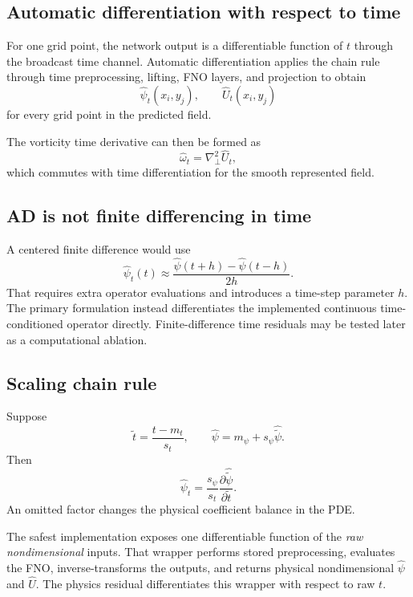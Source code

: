 \documentclass[11pt]{article}
\newcommand{\pd}{\partial}
\newcommand{\Lap}{\nabla_\perp^2}
\begin{document}
\subsection{Automatic differentiation with respect to time}
For one grid point, the network output is a differentiable function of $t$ through the broadcast time channel. Automatic differentiation applies the chain rule through time preprocessing, lifting, FNO layers, and projection to obtain
\begin{equation}
\widehat\psi_t(x_i,y_j),\qquad \widehat U_t(x_i,y_j)
\end{equation}
for every grid point in the predicted field.

The vorticity time derivative can then be formed as
\begin{equation}
\widehat\omega_t=\Lap\widehat U_t,
\end{equation}
which commutes with time differentiation for the smooth represented field.

\subsection{AD is not finite differencing in time}
A centered finite difference would use
\begin{equation}
\widehat\psi_t(t)\approx
\frac{\widehat\psi(t+h)-\widehat\psi(t-h)}{2h}.
\end{equation}
That requires extra operator evaluations and introduces a time-step parameter $h$. The primary formulation instead differentiates the implemented continuous time-conditioned operator directly. Finite-difference time residuals may be tested later as a computational ablation.

\subsection{Scaling chain rule}
Suppose
\begin{equation}
\widetilde t=\frac{t-m_t}{s_t},
\qquad
\widehat\psi=m_\psi+s_\psi\widehat{\widetilde\psi}.
\end{equation}
Then
\begin{equation}
\widehat\psi_t
=\frac{s_\psi}{s_t}
\frac{\pd\widehat{\widetilde\psi}}{\pd\widetilde t}.
\label{eq:time_chain}
\end{equation}
An omitted factor changes the physical coefficient balance in the PDE.

\begin{practicebox}
The safest implementation exposes one differentiable function of the \emph{raw nondimensional} inputs. That wrapper performs stored preprocessing, evaluates the FNO, inverse-transforms the outputs, and returns physical nondimensional $\widehat\psi$ and $\widehat U$. The physics residual differentiates this wrapper with respect to raw $t$.
\end{practicebox}
\end{document}
